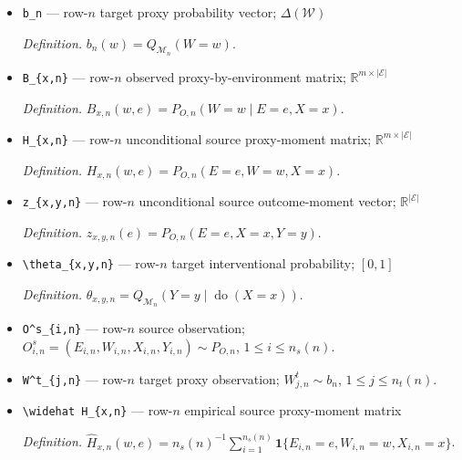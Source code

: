 \documentclass{article}
\begin{document}
\begin{itemize}
  \par\smallskip\noindent\emph{Definition.} The observed law of \((E,W,X,Y)\) induced by \(\mathcal M_n\).
  \item \texttt{b\_\allowbreak{}n} --- row-\(n\) target proxy probability vector; \(\Delta(\mathcal W)\)
  \par\smallskip\noindent\emph{Definition.} \(b_n(w)=Q_{\mathcal M_n}(W=w)\).
  \item \texttt{B\_\allowbreak{}\{x,\allowbreak{}n\}\allowbreak{}} --- row-\(n\) observed proxy-by-environment matrix; \(\mathbb R^{m\times\lvert\mathcal E\rvert}\)
  \par\smallskip\noindent\emph{Definition.} \(B_{x,n}(w,e)=P_{O,n}(W=w\mid E=e,X=x)\).
  \item \texttt{H\_\allowbreak{}\{x,\allowbreak{}n\}\allowbreak{}} --- row-\(n\) unconditional source proxy-moment matrix; \(\mathbb R^{m\times\lvert\mathcal E\rvert}\)
  \par\smallskip\noindent\emph{Definition.} \(H_{x,n}(w,e)=P_{O,n}(E=e,W=w,X=x)\).
  \item \texttt{z\_\allowbreak{}\{x,\allowbreak{}y,\allowbreak{}n\}\allowbreak{}} --- row-\(n\) unconditional source outcome-moment vector; \(\mathbb R^{\lvert\mathcal E\rvert}\)
  \par\smallskip\noindent\emph{Definition.} \(z_{x,y,n}(e)=P_{O,n}(E=e,X=x,Y=y)\).
  \item \texttt{\textbackslash{}\allowbreak{}theta\_\allowbreak{}\{x,\allowbreak{}y,\allowbreak{}n\}\allowbreak{}} --- row-\(n\) target interventional probability; \([0,1]\)
  \par\smallskip\noindent\emph{Definition.} \(\theta_{x,y,n}=Q_{\mathcal M_n}(Y=y\mid\operatorname{do}(X=x))\).
  \item \texttt{O\textasciicircum{}s\_\allowbreak{}\{i,\allowbreak{}n\}\allowbreak{}} --- row-\(n\) source observation; \(O^s_{i,n}=(E_{i,n},W_{i,n},X_{i,n},Y_{i,n})\sim P_{O,n}\), \(1\le i\le n_s(n)\).
  \item \texttt{W\textasciicircum{}t\_\allowbreak{}\{j,\allowbreak{}n\}\allowbreak{}} --- row-\(n\) target proxy observation; \(W^t_{j,n}\sim b_n\), \(1\le j\le n_t(n)\).
  \item \texttt{\textbackslash{}\allowbreak{}widehat H\_\allowbreak{}\{x,\allowbreak{}n\}\allowbreak{}} --- row-\(n\) empirical source proxy-moment matrix
  \par\smallskip\noindent\emph{Definition.} \(\widehat H_{x,n}(w,e)=n_s(n)^{-1}\sum_{i=1}^{n_s(n)}\mathbf 1\{E_{i,n}=e,W_{i,n}=w,X_{i,n}=x\}\).

\end{itemize}
\end{document}
